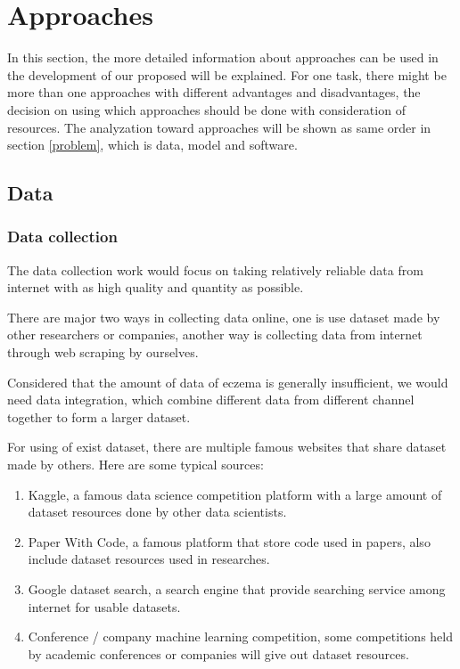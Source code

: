 \section{Approaches}\label{Approaches}
    In this section, the more detailed information about approaches can be used in the development of our proposed will be explained. For one task, there might be more than one approaches with different advantages and disadvantages, the decision on using which approaches should be done with consideration of resources. The analyzation toward approaches will be shown as same order in section \ref{problem}, which is data, model and software.
        \subsection{Data}
            \subsubsection{Data collection}
                The data collection work would focus on taking relatively reliable data from internet with as high quality and quantity as possible. 

                There are major two ways in collecting data online, one is use dataset made by other researchers or companies, another way is collecting data from internet through web scraping by ourselves.

                Considered that the amount of data of eczema is generally insufficient, we would need data integration, which combine different data from different channel together to form a larger dataset.

                For using of exist dataset, there are multiple famous websites that share dataset made by others. Here are some typical sources:
                \begin{enumerate}
                    \item Kaggle, a famous data science competition platform with a large amount of dataset resources done by other data scientists.
                    \item Paper With Code, a famous platform that store code used in papers, also include dataset resources used in researches.
                    \item Google dataset search, a search engine that provide searching service among internet for usable datasets.
                    \item Conference / company machine learning competition, some competitions held by academic conferences or companies will give out dataset resources.
                \end{enumerate}

